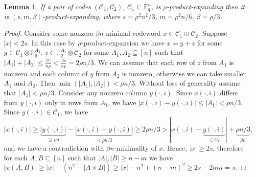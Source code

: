 \documentclass[11pt]{article}
\let\le\leqslant
\let\ge\geqslant
\theoremstyle{plain}
\newtheorem{lemma}{Lemma}
\theoremstyle{definition}
\theoremstyle{remark}
\newcommand{\wt}{\mathbf{wt}}
\newcommand{\cC}{\mathcal{C}}
\newcommand{\F}{\mathbb{F}}
\begin{document}
\begin{lemma}
    If a pair of codes $(\cC_1, \cC_2)$, $\cC_1\subseteq \F_q^{n}$, is $\rho$-product-expanding then 
    it is $(s,m,\beta)$-product-expanding, where $s=\rho^2n^2/3$, $m=\rho^2 n/6$, $\beta=\rho/3$.
\end{lemma}
\begin{proof}
    Consider some nonzero $\beta n$-minimal codeword $x\in \cC_1\boxplus \cC_2$. %
    Suppose $|x|< 2s$. In this case by $\rho$-product-expansion we have $x=y+z$ for some $y\in \cC_1\otimes \F_q^{A_2}$, $z\in\F_q^{A_1}\otimes \cC_2$ for some $A_1,A_2\subseteq [n]$ such that $|A_1|+|A_2|\le \frac{|x|}{n\rho} < \frac{2s}{n\rho}=2\rho n/3$. We can assume that each row of $z$ from $A_1$ is nonzero and each column of $y$ from $A_2$ is nonzero, otherwise we can take smaller $A_1$ and $A_2$. %
    Then $\min(|A_1|,|A_2|)< \rho n/3$. Without loss of generality assume that $|A_1|<\rho n/3$. Consider any nonzero column $y(\cdot, i)$. Since $x(\cdot,i)$ differs from $y(\cdot, i)$ only in rows from $A_1$, we have $|x(\cdot,i)-y(\cdot,i)|\le |A_1|< \rho n/3$. Since $y(\cdot,i)\in \cC_1$, we have 
    $$|x(\cdot,i)|\ge \underbrace{|y(\cdot,i)|}_{\ge \rho n}-\underbrace{|x(\cdot,i)-y(\cdot,i)|}_{<\rho n/3}\ge 2\rho n /3>|x(\cdot,i)-\underbrace{y(\cdot,i)}_{\in \cC_1}|+\underbrace{\rho n/3}_{\beta n},$$
    and we have a contradiction with $\beta n$-minimality of $x$. %
    Hence, $|x|\ge 2s$, therefore for each $A,B\subseteq [n]$ such that $|A|,|B|\ge n-m$ we have $|x(A,B)|\ge |x|-(n^2-|A\times B|)\ge |x|-n^2+(n-m)^2\ge 2s - 2mn = s$.
\end{proof}
\end{document}
